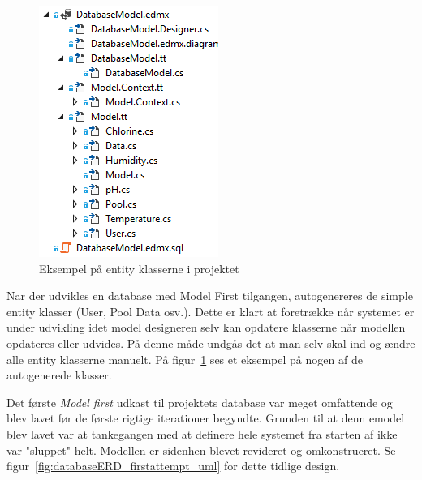 \begin{figure}
\centering
\includegraphics[width=0.35\linewidth]{figs/generatedFiles}
\caption{Eksempel på entity klasserne i projektet}
\label{fig:generatedFiles}
\end{figure}

Nar der udvikles en database med Model First tilgangen, autogenereres de simple entity klasser (User, Pool Data osv.). Dette er klart at foretrække når systemet er under udvikling idet model designeren selv kan opdatere klasserne når modellen opdateres eller udvides. På denne måde undgås det at man selv skal ind og ændre alle entity klasserne manuelt. På figur~\ref{fig:generatedFiles} ses et eksempel på nogen af de autogenerede klasser.

Det første \textit{Model first} udkast til projektets database var meget omfattende og blev lavet før de første rigtige iterationer begyndte. Grunden til at denn emodel blev lavet var at tankegangen med at definere hele systemet fra starten af ikke var "sluppet" helt. Modellen er sidenhen blevet revideret og omkonstrueret. Se figur~\ref{fig:databaseERD_firstattempt_uml} for dette tidlige design.

